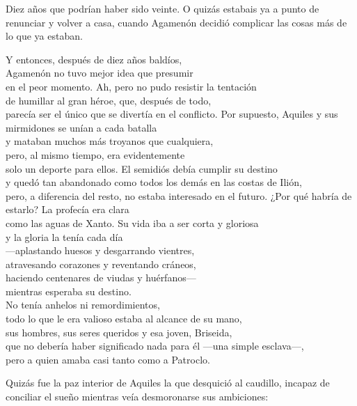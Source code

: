 Diez años que podrían haber sido veinte. O quizás estabais ya a punto de renunciar y volver a casa, cuando Agamenón decidió complicar las cosas más de lo que ya estaban.

\begin{versopropio}
Y entonces, después de diez años baldíos,\\
Agamenón no tuvo mejor idea que presumir\\
en el peor momento. Ah, pero no pudo resistir la tentación\\
de humillar al gran héroe, que, después de todo,\\
parecía ser el único que se divertía en el conflicto.
\stanzabreak
Por supuesto, Aquiles y sus mirmidones se unían a cada batalla\\
y mataban muchos más troyanos que cualquiera,\\
pero, al mismo tiempo, era evidentemente\\
solo un deporte para ellos. El semidiós debía cumplir su destino\\
y quedó tan abandonado como todos los demás en las costas de Ilión,\\
pero, a diferencia del resto, no estaba interesado en el futuro.
\stanzabreak
¿Por qué habría de estarlo? La profecía era clara\\
como las aguas de Xanto. Su vida iba a ser corta y gloriosa\\
y la gloria la tenía cada día\\
---aplastando huesos y desgarrando vientres,\\
atravesando corazones y reventando cráneos,\\
haciendo centenares de viudas y huérfanos---\\
mientras esperaba su destino.\\
No tenía anhelos ni remordimientos,\\
todo lo que le era valioso estaba al alcance de su mano,\\
sus hombres, sus seres queridos y esa joven, Briseida,\\
que no debería haber significado nada para él ---una simple esclava---,\\
pero a quien amaba casi tanto como a Patroclo.
\end{versopropio}

Quizás fue la paz interior de Aquiles la que desquició al caudillo, incapaz de conciliar el sueño mientras veía desmoronarse sus ambiciones:

